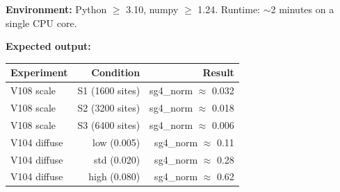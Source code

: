 \documentclass[11pt]{article}
\begin{document}
\textbf{Environment:} Python $\geq$ 3.10, numpy $\geq$ 1.24. Runtime: $\sim$2 minutes on a single CPU core.

\textbf{Expected output:}
\begin{center}
\begin{tabular}{lrr}
\toprule
\textbf{Experiment} & \textbf{Condition} & \textbf{Result} \\
\midrule
V108 scale & S1 (1600 sites) & sg4\_norm $\approx$ 0.032 \\
V108 scale & S2 (3200 sites) & sg4\_norm $\approx$ 0.018 \\
V108 scale & S3 (6400 sites) & sg4\_norm $\approx$ 0.006 \\
V104 diffuse & low (0.005) & sg4\_norm $\approx$ 0.11 \\
V104 diffuse & std (0.020) & sg4\_norm $\approx$ 0.28 \\
V104 diffuse & high (0.080) & sg4\_norm $\approx$ 0.62 \\
\bottomrule
\end{tabular}
\end{center}
\end{document}
